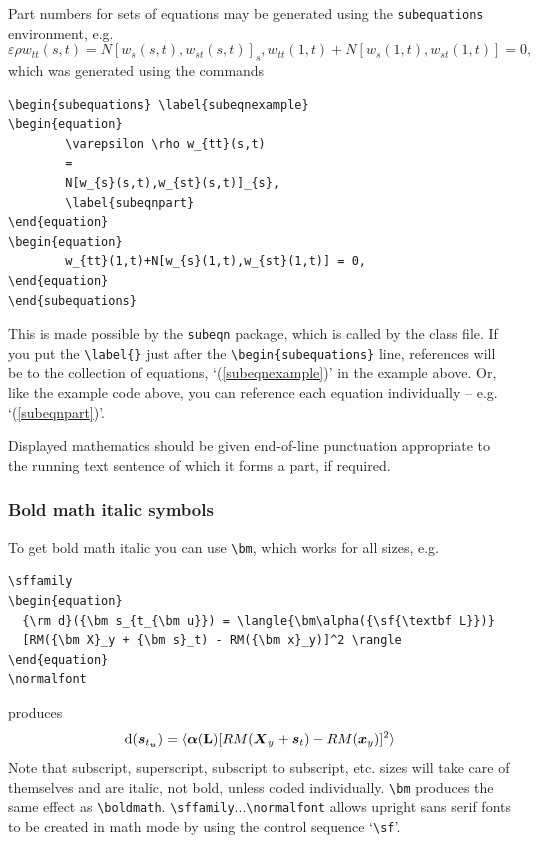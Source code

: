 \documentclass{gCOV2e}
\theoremstyle{plain}%
\theoremstyle{definition}
\theoremstyle{remark}
\begin{document}
Part numbers for sets of equations may be generated using the \texttt{subequations} environment, e.g.
\begin{subequations} \label{subeqnexample}
\begin{equation}
        \varepsilon \rho w_{tt}(s,t)
        =
        N[w_{s}(s,t),w_{st}(s,t)]_{s},
        \label{subeqnpart}
\end{equation}
\begin{equation}
        w_{tt}(1,t)+N[w_{s}(1,t),w_{st}(1,t)] = 0,
\end{equation}
\end{subequations}
which was generated using the commands
\begin{verbatim}
\begin{subequations} \label{subeqnexample}
\begin{equation}
        \varepsilon \rho w_{tt}(s,t)
        =
        N[w_{s}(s,t),w_{st}(s,t)]_{s},
        \label{subeqnpart}
\end{equation}
\begin{equation}
        w_{tt}(1,t)+N[w_{s}(1,t),w_{st}(1,t)] = 0,
\end{equation}
\end{subequations}
\end{verbatim}
This is made possible by the \texttt{subeqn} package, which is called
by the class file. If you put the \verb"\label{}" just after the
\verb"\begin{subequations}" line, references will be to the
collection of equations, `(\ref{subeqnexample})' in the example
above. Or, like the example code above, you can reference each
equation individually -- e.g. `(\ref{subeqnpart})'.

Displayed mathematics should be given end-of-line punctuation appropriate to the running text sentence of which it forms a part, if required.

\subsubsection{Bold math italic symbols}

To get bold math italic you can use \verb"\bm", which works for all sizes, e.g.
\begin{verbatim}
\sffamily
\begin{equation}
  {\rm d}({\bm s_{t_{\bm u}}) = \langle{\bm\alpha({\sf{\textbf L}})}
  [RM({\bm X}_y + {\bm s}_t) - RM({\bm x}_y)]^2 \rangle
\end{equation}
\normalfont
\end{verbatim}
produces\sffamily
\begin{equation}
  {\rm d}({\bm s_{t_{\bm u}}}) = \langle {\bm\alpha({\sf{\textbf L}})}[RM({\bm X}_y
  + {\bm s}_t) - RM({\bm x}_y)]^2 \rangle
\end{equation}\normalfont
Note that subscript, superscript, subscript to subscript, etc.
sizes will take care of themselves and are italic, not bold,
unless coded individually. \verb"\bm" produces the same effect as
\verb"\boldmath". \verb"\sffamily"...\verb"\normalfont" allows
upright sans serif fonts to be created in math mode by using the
control sequence `\verb"\sf"'.
\end{document}

